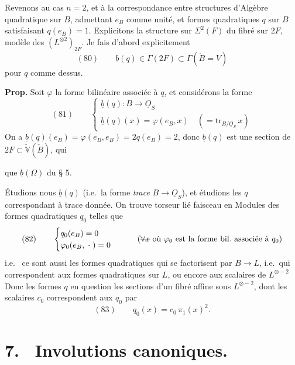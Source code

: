\documentclass[11pt,a4paper]{article}
\begin{document}
Revenons au cas $n = 2$, et à la correspondance entre structures d'Algèbre
quadratique sur $B$, admettant $e_B$ comme unité, et
  formes quadratiques $q$ sur $B$ satisfaisant
$q(e_B) = 1$. Explicitons la structure sur $\Sigma^2(F)$ du fibré
 sur $2F$, \struck{\ill{}} modèle des
 $(L^{\otimes 2})_{2F}$. Je fais d'abord explicitement
\[
(80)\qquad \underline{b}(q) \in \Gamma(2F) \subset \Gamma(\check{B} = V)
\]
pour $q$ comme dessus. 

\textbf{Prop.} Soit $\varphi$ la forme bilinéaire associée à $q$, et considérons la forme
\[
(81)\qquad
\begin{cases}
\underline{b}(q) : B \longrightarrow \underline{O}_S \\
\underline{b}(q)(x) = \varphi(e_B, x) \quad (= \mathrm{tr}_{B/\underline{O}_S}\, x)
\end{cases}
\]
On a $\underline{b}(q)(e_B) = \varphi(e_B, e_B) = 2 q(e_B) = 2$, donc
$\underline{b}(q)$ est une section de $2F \subset \check{\mathbb{V}}(\check{B})$, qui
\ill{}

 que $\underline{b}(\Omega)$ du § 5.

Étudions nous $\underline{b}(q)$  (i.e.\ la forme
\emph{trace} $B \to \underline{O}_S$), et étudions les $q$ correspondant à
 trace donnée. On trouve   torseur lié  faisceau en
Modules des formes quadratiques $q_0$ telles que
\[
(82)\qquad
\begin{cases}
q_0(e_B) = 0 \\
\varphi_0(e_B, \;\cdot\;) = 0
\end{cases}
\qquad \text{(\struck{$\forall x$} où $\varphi_0$ est la forme bil.\ associée à $q_0$)}
\]
i.e.\  ce sont aussi les formes
quadratiques qui se factorisent par $B \to L$, i.e.\ qui correspondent aux formes
quadratiques sur $L$, ou encore aux  scalaires de
$L^{\otimes -2}$
Donc les formes $q$ en question  les sections d'un fibré affine sous
$L^{\otimes -2}$, dont les scalaires $c_0$ correspondent aux $q_0$ par
\[
(83)\qquad q_0(x) = c_0\, \pi_1(x)^2 .
\]

\section*{7.~ Involutions canoniques.}
\end{document}
